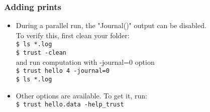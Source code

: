 \documentclass[10pt, hyperref={unicode=true,pdfusetitle, bookmarks=true,bookmarksnumbered=false,bookmarksopen=false, breaklinks=false,pdfborder={0 0 1},backref=true,colorlinks=true,linkcolor=darkblue,pageanchor, urlcolor=darkblue}]{beamer}
\begin{document}
\begin{frame}
\frametitle{Adding prints}
\begin{block}{}

\begin{itemize}


\item During a parallel run, the "Journal()" output can be disabled. \\
To verify this, first clean your folder:\\
\texttt{\$ ls *.log}\\
\texttt{\$ trust -clean}\\
and run computation with -journal=0 option \\
\texttt{\$ trust hello 4 -journal=0}\\
\texttt{\$ ls *.log}

\item Other options are available. To get it, run:\\
\texttt{\$ trust hello.data -help\_trust}

\end{itemize}

\end{block}
\end{frame}
\end{document}
